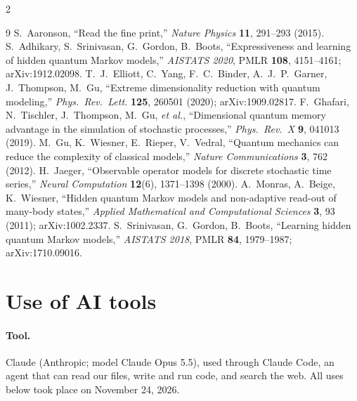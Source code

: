 \documentclass[11pt]{article}
\begin{document}
\begin{multicols}{2}
\renewcommand{\section}[2]{\subsection*{#2}}
\begin{thebibliography}{9}\footnotesize\setlength{\itemsep}{0pt}
 S.~Aaronson, ``Read the fine print,'' \emph{Nature Physics} \textbf{11}, 291--293 (2015).
 S.~Adhikary, S.~Srinivasan, G.~Gordon, B.~Boots, ``Expressiveness and learning of hidden quantum Markov models,'' \emph{AISTATS 2020}, PMLR \textbf{108}, 4151--4161; arXiv:1912.02098.
 T.~J.~Elliott, C.~Yang, F.~C.~Binder, A.~J.~P.~Garner, J.~Thompson, M.~Gu, ``Extreme dimensionality reduction with quantum modeling,'' \emph{Phys.\ Rev.\ Lett.} \textbf{125}, 260501 (2020); arXiv:1909.02817.
 F.~Ghafari, N.~Tischler, J.~Thompson, M.~Gu, \emph{et al.}, ``Dimensional quantum memory advantage in the simulation of stochastic processes,'' \emph{Phys.\ Rev.\ X} \textbf{9}, 041013 (2019).
 M.~Gu, K.~Wiesner, E.~Rieper, V.~Vedral, ``Quantum mechanics can reduce the complexity of classical models,'' \emph{Nature Communications} \textbf{3}, 762 (2012).
 H.~Jaeger, ``Observable operator models for discrete stochastic time series,'' \emph{Neural Computation} \textbf{12}(6), 1371--1398 (2000).
 A.~Monras, A.~Beige, K.~Wiesner, ``Hidden quantum Markov models and non-adaptive read-out of many-body states,'' \emph{Applied Mathematical and Computational Sciences} \textbf{3}, 93 (2011); arXiv:1002.2337.
 S.~Srinivasan, G.~Gordon, B.~Boots, ``Learning hidden quantum Markov models,'' \emph{AISTATS 2018}, PMLR \textbf{84}, 1979--1987; arXiv:1710.09016.
\end{thebibliography}
\end{multicols}

\section*{Use of AI tools}

\paragraph{Tool.} Claude (Anthropic; model Claude Opus 5.5), used through Claude Code, an agent that can read our files, write and run code, and search the web. All uses below took place on November 24, 2026.
\end{document}
